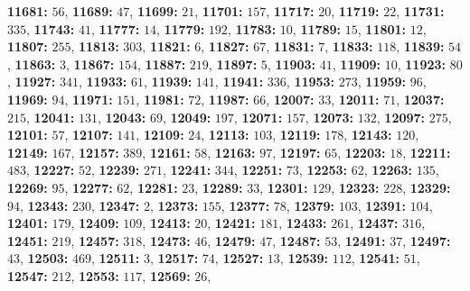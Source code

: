 \textsf{\bfseries 11681:} $56$, \textsf{\bfseries 11689:} $47$, \textsf{\bfseries 11699:} $21$, \textsf{\bfseries 11701:} $157$, \textsf{\bfseries 11717:} $20$, \textsf{\bfseries 11719:} $22$, \textsf{\bfseries 11731:} $335$, \textsf{\bfseries 11743:} $41$, \textsf{\bfseries 11777:} $14$, \textsf{\bfseries 11779:} $192$, \textsf{\bfseries 11783:} $10$, \textsf{\bfseries 11789:} $15$, \textsf{\bfseries 11801:} $12$, \textsf{\bfseries 11807:} $255$, \textsf{\bfseries 11813:} $303$, \textsf{\bfseries 11821:} $6$, \textsf{\bfseries 11827:} $67$, \textsf{\bfseries 11831:} $7$, \textsf{\bfseries 11833:} $118$, \textsf{\bfseries 11839:} $54$, \textsf{\bfseries 11863:} $3$, \textsf{\bfseries 11867:} $154$, \textsf{\bfseries 11887:} $219$, \textsf{\bfseries 11897:} $5$, \textsf{\bfseries 11903:} $41$, \textsf{\bfseries 11909:} $10$, \textsf{\bfseries 11923:} $80$, \textsf{\bfseries 11927:} $341$, \textsf{\bfseries 11933:} $61$, \textsf{\bfseries 11939:} $141$, \textsf{\bfseries 11941:} $336$, \textsf{\bfseries 11953:} $273$, \textsf{\bfseries 11959:} $96$, \textsf{\bfseries 11969:} $94$, \textsf{\bfseries 11971:} $151$, \textsf{\bfseries 11981:} $72$, \textsf{\bfseries 11987:} $66$, \textsf{\bfseries 12007:} $33$, \textsf{\bfseries 12011:} $71$, \textsf{\bfseries 12037:} $215$, \textsf{\bfseries 12041:} $131$, \textsf{\bfseries 12043:} $69$, \textsf{\bfseries 12049:} $197$, \textsf{\bfseries 12071:} $157$, \textsf{\bfseries 12073:} $132$, \textsf{\bfseries 12097:} $275$, \textsf{\bfseries 12101:} $57$, \textsf{\bfseries 12107:} $141$, \textsf{\bfseries 12109:} $24$, \textsf{\bfseries 12113:} $103$, \textsf{\bfseries 12119:} $178$, \textsf{\bfseries 12143:} $120$, \textsf{\bfseries 12149:} $167$, \textsf{\bfseries 12157:} $389$, \textsf{\bfseries 12161:} $58$, \textsf{\bfseries 12163:} $97$, \textsf{\bfseries 12197:} $65$, \textsf{\bfseries 12203:} $18$, \textsf{\bfseries 12211:} $483$, \textsf{\bfseries 12227:} $52$, \textsf{\bfseries 12239:} $271$, \textsf{\bfseries 12241:} $344$, \textsf{\bfseries 12251:} $73$, \textsf{\bfseries 12253:} $62$, \textsf{\bfseries 12263:} $135$, \textsf{\bfseries 12269:} $95$, \textsf{\bfseries 12277:} $62$, \textsf{\bfseries 12281:} $23$, \textsf{\bfseries 12289:} $33$, \textsf{\bfseries 12301:} $129$, \textsf{\bfseries 12323:} $228$, \textsf{\bfseries 12329:} $94$, \textsf{\bfseries 12343:} $230$, \textsf{\bfseries 12347:} $2$, \textsf{\bfseries 12373:} $155$, \textsf{\bfseries 12377:} $78$, \textsf{\bfseries 12379:} $103$, \textsf{\bfseries 12391:} $104$, \textsf{\bfseries 12401:} $179$, \textsf{\bfseries 12409:} $109$, \textsf{\bfseries 12413:} $20$, \textsf{\bfseries 12421:} $181$, \textsf{\bfseries 12433:} $261$, \textsf{\bfseries 12437:} $316$, \textsf{\bfseries 12451:} $219$, \textsf{\bfseries 12457:} $318$, \textsf{\bfseries 12473:} $46$, \textsf{\bfseries 12479:} $47$, \textsf{\bfseries 12487:} $53$, \textsf{\bfseries 12491:} $37$, \textsf{\bfseries 12497:} $43$, \textsf{\bfseries 12503:} $469$, \textsf{\bfseries 12511:} $3$, \textsf{\bfseries 12517:} $74$, \textsf{\bfseries 12527:} $13$, \textsf{\bfseries 12539:} $112$, \textsf{\bfseries 12541:} $51$, \textsf{\bfseries 12547:} $212$, \textsf{\bfseries 12553:} $117$, \textsf{\bfseries 12569:} $26$, 
